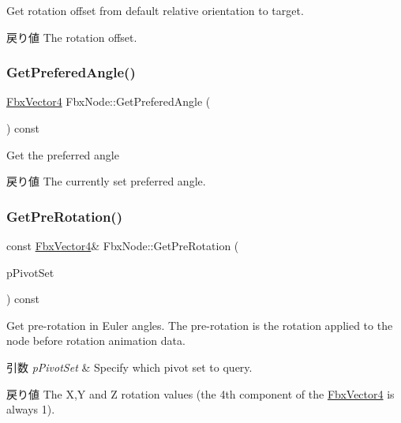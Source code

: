 Get rotation offset from default relative orientation to target. \begin{DoxyReturn}{戻り値}
The rotation offset. 
\end{DoxyReturn}
\mbox{\label{class_fbx_node_a4f7c629e1004164f09a751432a442f74}} 
\subsubsection{\texorpdfstring{Get\+Prefered\+Angle()}{GetPreferedAngle()}}
{\footnotesize\ttfamily \hyperlink{class_fbx_vector4}{Fbx\+Vector4} Fbx\+Node\+::\+Get\+Prefered\+Angle (\begin{DoxyParamCaption}{ }\end{DoxyParamCaption}) const}

Get the preferred angle \begin{DoxyReturn}{戻り値}
The currently set preferred angle. 
\end{DoxyReturn}
\mbox{\label{class_fbx_node_a73ab4581c4eccfe9b1cc56045102dc50}} 
\subsubsection{\texorpdfstring{Get\+Pre\+Rotation()}{GetPreRotation()}}
{\footnotesize\ttfamily const \hyperlink{class_fbx_vector4}{Fbx\+Vector4}\& Fbx\+Node\+::\+Get\+Pre\+Rotation (\begin{DoxyParamCaption}\item[{\hyperlink{class_fbx_node_ae62b7311ac4727654cdf1ebd5cbf7343}{E\+Pivot\+Set}}]{p\+Pivot\+Set }\end{DoxyParamCaption}) const}

Get pre-\/rotation in Euler angles. The pre-\/rotation is the rotation applied to the node before rotation animation data. 
\begin{DoxyParams}{引数}
{\em p\+Pivot\+Set} & Specify which pivot set to query. \\
\hline
\end{DoxyParams}
\begin{DoxyReturn}{戻り値}
The X,Y and Z rotation values (the 4th component of the \hyperlink{class_fbx_vector4}{Fbx\+Vector4} is always 1). 
\end{DoxyReturn}
\mbox{\label{class_fbx_node_a58c6ad6cb9f2ee26f4ba917e0d7ff714}} 

